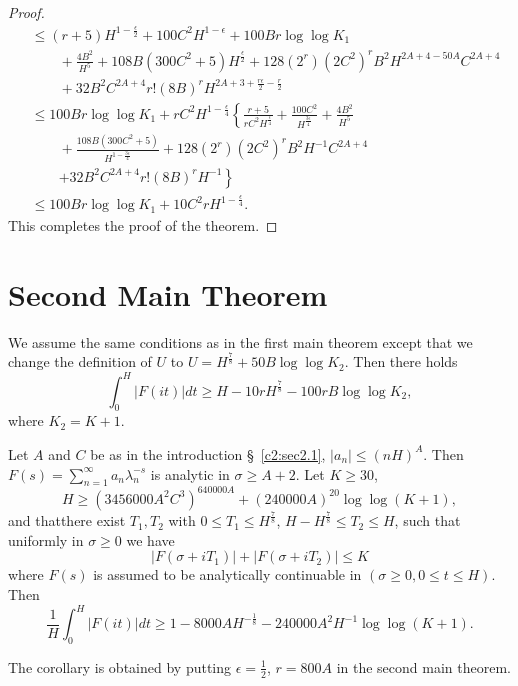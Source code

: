 \begin{proof}
\begin{align*}
& \leq (r+5) H^{1-\frac{\epsilon}{2}} + 100 C^2 H^{1-\epsilon} + 100 Br \log \log K_1\\
&\qquad {} + \frac{4B^2}{H^5} + 108 B (300 C^2 +5) H^{\frac{\epsilon}{2}} + 128 (2^r) (2C^2)^r B^2 H^{2A+4 - 50A } C^{2A+4}\\
&\qquad {} + 32 B^2 C^{2A+4} r ! (8B)^r H^{2A +3 + \frac{r\epsilon}{2} -\frac{r}{2}}\\
& \leq 100 Br \log \log K_1 + r C^2 H^{1-\frac{\epsilon}{4}} \left\{\frac{r+5}{rC^2 H^{\frac{\epsilon}{4}}} + \frac{100 C^2}{H^{\frac{3\epsilon}{4}}}+ \frac{4B^2}{H^5} \right.\\
&\left.\qquad {}  + \frac{108B (300C^2
    +5)}{H^{1-\frac{3\epsilon}{4}}} + 128 (2^r) (2C^2)^r B^2 H^{-1}
  C^{2A+4}\right.\\ 
&\qquad{}\left.+ 32 B^2 C^{2A+4} r! (8B)^r H^{-1}  \right\}\\
& \leq 100 Br \log \log K_1 + 10 C^2 r H^{1-\frac{\epsilon}{4}}. 
\end{align*}
This completes the proof of the theorem. 
\end{proof}

\section{Second Main Theorem}\label{c2:sec2.4}

We assume the same conditions as in the first main theorem except that we change the definition of $U$ to $U = H^{\frac{7}{8}} + 50 B \log \log K_2$. Then there holds
$$
\int^H_0 |F(it)| dt \ge H - 10 r H^{\frac{7}{8}} - 100 r B \log \log K_2, 
$$ 
where $K_2 = K+1$.

\begin{coro*}
Let $A$ and $C$ be as in the introduction \S\ \ref{c2:sec2.1}, $|a_n| \leq (nH)^A$. Then $F(s) = \sum\limits^\infty_{n=1} a_n \lambda^{-s}_n$ is analytic in $\sigma \geq A +2$. Let $K \geq 30$,
$$
H \geq (3456000A^2 C^3)^{640000A} + (240000A)^{20} \log \log (K+1), 
$$
and that\pageoriginale there exist $T_1, T_2$ with $0\leq T_1 \leq H^{\frac{7}{8}}$, $H-H^{\frac{7}{8}} \leq T_2 \leq H$, such that uniformly in $\sigma \geq 0$ we have
$$
|F(\sigma+iT_1)| + |F(\sigma + iT_2)| \leq K
$$
where $F(s)$ is assumed to be analytically continuable in $(\sigma \geq 0, 0 \leq t \leq H)$. Then
$$
\frac{1}{H}\int^H_0 |F(it)| dt \geq 1 - 8000 A H^{-\frac{1}{8}} - 240000 A^2 H^{-1} \log\log (K+1).
$$

The corollary is obtained by putting $\epsilon = \frac{1}{2}$, $r = 800 A$  in the second main theorem. 
\end{coro*}

